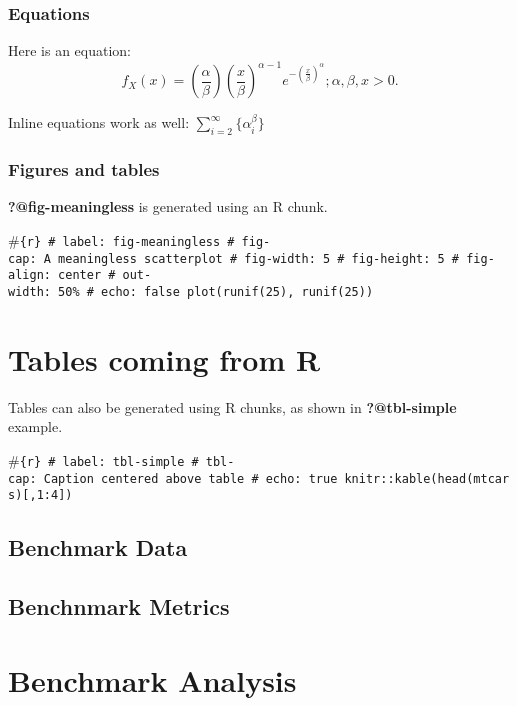 \documentclass[
  authoryear,
  preprint]{elsarticle}
\begin{document}
\subsubsection{Equations}\label{equations}

Here is an equation: \[ 
  f_{X}(x) = \left(\frac{\alpha}{\beta}\right)
  \left(\frac{x}{\beta}\right)^{\alpha-1}
  e^{-\left(\frac{x}{\beta}\right)^{\alpha}}; 
  \alpha,\beta,x > 0 .
\]

Inline equations work as well: \(\sum_{i = 2}^\infty\{\alpha_i^\beta\}\)

\subsubsection{Figures and tables}\label{figures-and-tables}

\textbf{?@fig-meaningless} is generated using an R chunk.

\#\texttt{\{r\}\ \#\textbar{}\ label:\ fig-meaningless\ \#\textbar{}\ fig-cap:\ A\ meaningless\ scatterplot\ \#\textbar{}\ fig-width:\ 5\ \#\textbar{}\ fig-height:\ 5\ \#\textbar{}\ fig-align:\ center\ \#\textbar{}\ out-width:\ 50\%\ \#\textbar{}\ echo:\ false\ plot(runif(25),\ runif(25))}

\section{Tables coming from R}\label{tables-coming-from-r}

Tables can also be generated using R chunks, as shown in
\textbf{?@tbl-simple} example.

\#\texttt{\{r\}\ \#\textbar{}\ label:\ tbl-simple\ \#\textbar{}\ tbl-cap:\ Caption\ centered\ above\ table\ \#\textbar{}\ echo:\ true\ knitr::kable(head(mtcars){[},1:4{]})}

\subsection{Benchmark Data}\label{benchmark-data}

\subsection{Benchnmark Metrics}\label{benchnmark-metrics}

\section{Benchmark Analysis}\label{benchmark-analysis}
\end{document}
